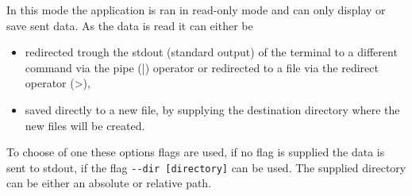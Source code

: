 In this mode the application is ran in read-only mode and can only display or save sent data. As the data is read it can either be
\begin{itemize}
  \item redirected trough the stdout (standard output) of the terminal to a different command via the pipe (|) operator or redirected to a file via the redirect operator (>),
  \item saved directly to a new file, by supplying the destination directory where the new files will be created.
\end{itemize}
To choose of one these options flags are used, if no flag is supplied the data is sent to stdout, if the flag \texttt{-\--dir [directory]} can be used. The supplied directory can be either an absolute or relative path.